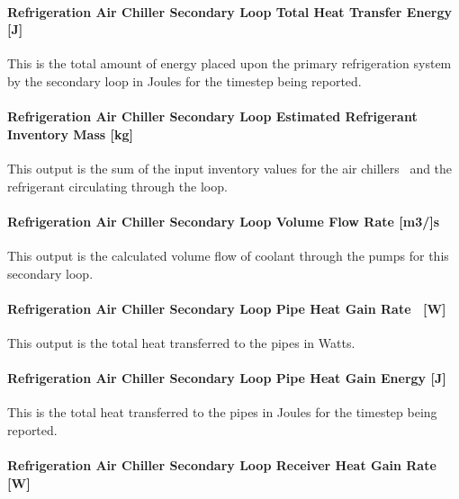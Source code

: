 \paragraph{Refrigeration Air Chiller Secondary Loop Total Heat Transfer Energy {[}J{]}}\label{refrigeration-air-chiller-secondary-loop-total-heat-transfer-energy-j}

This is the total amount of energy placed upon the primary refrigeration system by the secondary loop in Joules for the timestep being reported.

\paragraph{Refrigeration Air Chiller Secondary Loop Estimated Refrigerant Inventory Mass {[}kg{]}}\label{refrigeration-air-chiller-secondary-loop-estimated-refrigerant-inventory-mass-kg}

This output is the sum of the input inventory values for the air chillers~ and the refrigerant circulating through the loop.

\paragraph{Refrigeration Air Chiller Secondary Loop Volume Flow Rate {[}m3/{]}s}\label{refrigeration-air-chiller-secondary-loop-volume-flow-rate-m3s}

This output is the calculated volume flow of coolant through the pumps for this secondary loop.

\paragraph{Refrigeration Air Chiller Secondary Loop Pipe Heat Gain Rate~ {[}W{]}}\label{refrigeration-air-chiller-secondary-loop-pipe-heat-gain-rate-w}

This output is the total heat transferred to the pipes in Watts.

\paragraph{Refrigeration Air Chiller Secondary Loop Pipe Heat Gain Energy {[}J{]}}\label{refrigeration-air-chiller-secondary-loop-pipe-heat-gain-energy-j}

This is the total heat transferred to the pipes in Joules for the timestep being reported.

\paragraph{Refrigeration Air Chiller Secondary Loop Receiver Heat Gain Rate~ {[}W{]}}\label{refrigeration-air-chiller-secondary-loop-receiver-heat-gain-rate-w}

